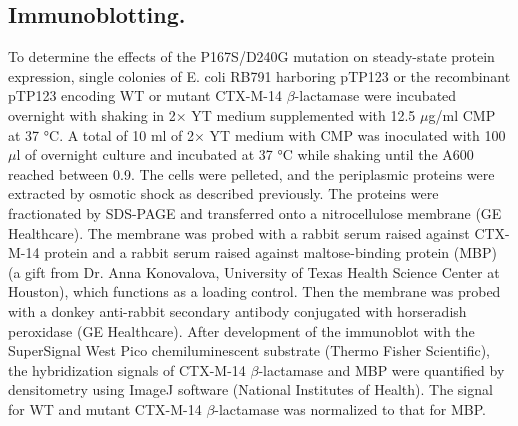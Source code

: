 \documentclass[../main.tex]{subfiles}
\begin{document}
    \subsection{Immunoblotting.}
        To determine the effects of the P167S/D240G mutation on steady-state protein expression, single colonies of E. coli RB791 harboring pTP123 or the recombinant pTP123 encoding WT or mutant CTX-M-14 $\beta$-lactamase were incubated overnight with shaking in 2× YT medium supplemented with 12.5 $\mu$g/ml CMP at 37 °C. A total of 10 ml of 2× YT medium with CMP was inoculated with 100 $\mu$l of overnight culture and incubated at 37 °C while shaking until the A600 reached between 0.9. The cells were pelleted, and the periplasmic proteins were extracted by osmotic shock as described previously\cite{patel_synergistic_2018}. The proteins were fractionated by SDS-PAGE and transferred onto a nitrocellulose membrane (GE Healthcare). The membrane was probed with a rabbit serum raised against CTX-M-14 protein and a rabbit serum raised against maltose-binding protein (MBP) (a gift from Dr. Anna Konovalova, University of Texas Health Science Center at Houston), which functions as a loading control. Then the membrane was probed with a donkey anti-rabbit secondary antibody conjugated with horseradish peroxidase (GE Healthcare). After development of the immunoblot with the SuperSignal West Pico chemiluminescent substrate (Thermo Fisher Scientific), the hybridization signals of CTX-M-14 $\beta$-lactamase and MBP were quantified by densitometry using ImageJ software (National Institutes of Health). The signal for WT and mutant CTX-M-14 $\beta$-lactamase was normalized to that for MBP.
\end{document}
